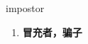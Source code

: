 
\begin{frame}
{\huge impostor}
\begin{center}
\begin{enumerate}\Large
  \item \textbf{冒充者，骗子}
\end{enumerate}
\end{center}
\end{frame}
